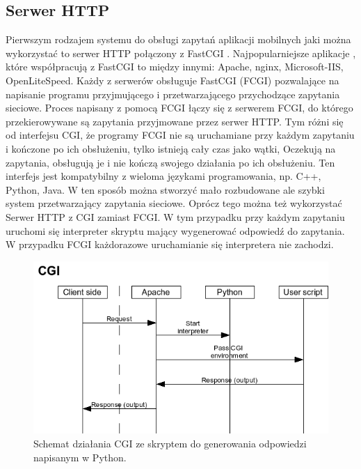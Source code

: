 \documentclass[eng]{mgr}
\begin{document}
			\subsection{Serwer HTTP}
			Pierwszym rodzajem systemu do obsługi zapytań aplikacji mobilnych jaki można wykorzystać to serwer HTTP połączony z FastCGI \cite{fcgi}. Najpopularniejsze aplikacje \cite{httpserversusage}, które współpracują z FastCGI to między innymi: Apache, nginx, Microsoft-IIS, OpenLiteSpeed. Każdy z serwerów obsługuje FastCGI (FCGI) pozwalające na napisanie programu przyjmującego i przetwarzającego przychodzące zapytania sieciowe. Proces napisany z pomocą FCGI łączy się z serwerem FCGI, do którego przekierowywane są zapytania przyjmowane przez serwer HTTP. Tym różni się od interfejsu CGI, że programy FCGI nie są uruchamiane przy każdym zapytaniu i kończone po ich obsłużeniu, tylko istnieją cały czas jako wątki, Oczekują na zapytania, obsługują je i nie kończą swojego działania po ich obsłużeniu. Ten interfejs jest kompatybilny z wieloma językami programowania, np. C++, Python, Java. W ten sposób można stworzyć mało rozbudowane ale szybki system przetwarzający zapytania sieciowe.
			Oprócz tego można też wykorzystać Serwer HTTP z CGI zamiast FCGI. W tym przypadku przy każdym zapytaniu uruchomi się interpreter skryptu mający wygenerować odpowiedź do zapytania. W przypadku FCGI każdorazowe uruchamianie się interpretera nie zachodzi.
			
			\begin{center}
				\begin{figure}[ht]
					\centering
					\includegraphics[scale=0.7]{flow_cgi.png}
					\caption{Schemat działania CGI ze skryptem do generowania odpowiedzi napisanym w Python. \cite{fcgi}}
				\end{figure}
			\end{center}
		
\end{document}
